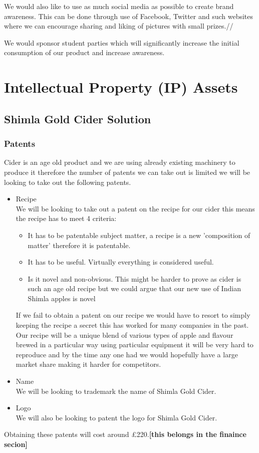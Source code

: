 \documentclass[11pt]{article}
\begin{document}
We would also like to use as much social media as possible to create brand awareness. This can be done through use of Facebook, Twitter and such websites where we can encourage sharing and liking  of pictures with small prizes.//

We would sponsor student parties which will significantly increase the initial consumption of our product and increase awareness.

\newpage
\section{Intellectual Property (IP) Assets}
  \subsection{Shimla Gold Cider Solution}
    \subsubsection{Patents}
    Cider is an age old product and we are using already existing machinery to
    produce it therefore the number of patents we can take out is limited we will
    be looking to take out the following patents.
    \begin{itemize}
    	\item Recipe \\
We will be looking to take out a patent on the recipe for our cider this means the recipe has to meet 4 criteria:
 	      \begin{itemize}
		    \item It has to be patentable subject matter, a recipe is a new 'composition of matter' therefore it is patentable.
		    \item It has to be useful. Virtually everything is considered useful.
		    \item Is it novel and non-obvious. This might be harder to prove as cider is such an age old recipe but we could argue that our new use of Indian Shimla apples is novel
	      \end{itemize}
If we fail to obtain a patent on our recipe we would have to resort to simply keeping the recipe a secret this has worked for many companies in the past. Our recipe will be a unique blend of various types of apple and flavour brewed in a particular way using particular equipment it will be very hard to reproduce and by the time any one had we would hopefully have a large market share making it harder for competitors.
	\item Name \\
    We will be looking to trademark the name of Shimla Gold Cider.
	\item Logo \\
    We will also be looking to patent the logo for Shimla Gold Cider.
    \end{itemize}
Obtaining these patents will cost around £220.\textbf{[this belongs in the finaince secion]}
\end{document}
